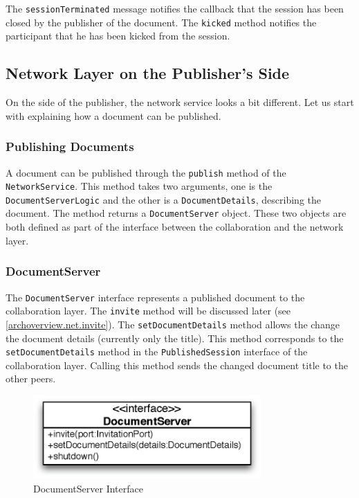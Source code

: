 The \texttt{sessionTerminated} message notifies the callback that the 
session has been closed
by the publisher of the document. The \texttt{kicked} method notifies the
participant that he has been kicked from the session.


\subsection{Network Layer on the Publisher's Side}
On the side of the publisher, the network service looks a bit different.
Let us start with explaining how a document can be published.

\subsubsection{Publishing Documents}
A document can be published through the \texttt{publish} method of the
\texttt{NetworkService}. This method takes two arguments, one is the
\texttt{DocumentServerLogic} and the other is a \texttt{DocumentDetails},
describing the document. The method returns a \texttt{DocumentServer}
object. These two objects are both defined as part of the interface between the
collaboration and the network layer.

\subsubsection{DocumentServer}
The \texttt{DocumentServer} interface 
represents a published document to the collaboration layer. The
\texttt{invite} method will be discussed later 
(see \ref{archoverview.net.invite}). The \texttt{setDocumentDetails}
method allows the change the document details (currently only the title).
This method corresponds to the \texttt{setDocumentDetails} method in
the \texttt{PublishedSession} interface of the collaboration layer.
Calling this method sends the changed document title to the other peers.

\begin{figure}[H]
 \centering
 \includegraphics[width=8.71cm,height=3.18cm]{../images/finalreport/architecture_documentserver_uml.eps}
 \caption{DocumentServer Interface}
\end{figure}

